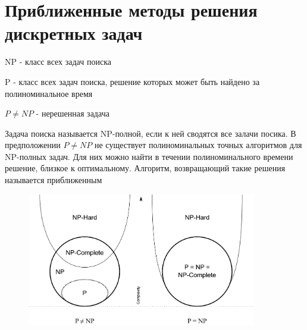 \documentclass[discrete.tex]{subfiles}
\begin{document}
  \section{Приближенные методы решения дискретных задач}
  NP - класс всех задач поиска

  P - класс всех задач поиска, решение которых может быть найдено за полиноминальное время

  $P \neq NP$ - нерешенная задача

  Задача поиска называется NP-полной, если к ней сводятся все залачи посика. В предположении $P \neq NP$ не существует полиноминальных точных алгоритмов для NP-полных задач. Для них можно найти в течении полиноминального времени решение, близкое к оптимальному. Алгоритм, возвращающий такие решения называется приближенным
  \begin{figure}[H]
      \includegraphics[width=10cm]{pics/58_1.png}
      \centering
  \end{figure}
\end{document}
